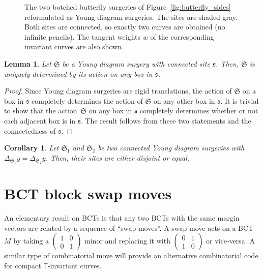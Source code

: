 \documentclass[11pt]{article}
\numberwithin{equation}{section}
\newtheorem{Corollary}[Theorem]{Corollary}
\newtheorem{Lemma}[Theorem]{Lemma}
\newcommand{\torus}{\mathbb T}
\newcommand{\site}{\mathfrak s}
\newcommand{\surgery}{\mathfrak S}
\begin{document}
\begin{figure}
{
}

\caption{The two botched butterfly surgeries of Figure~\ref{fig:butterfly_sides} reformulated as Young diagram surgeries. The sites are shaded gray. Both sites are connected, so exactly two curves are obtained (no infinite pencils). The tangent weights $w$ of the corresponding invariant curves are also shown.}
\label{fig:yd_surgeries}
\end{figure}

\begin{Lemma} \label{lemma:surgery_uniqueness}
Let $\surgery$ be a Young diagram surgery with connected site $\site$. Then, $\surgery$ is uniquely determined by its action on any box in $\site$.
\end{Lemma}
\begin{proof}
Since Young diagram surgeries are rigid translations, the action of $\surgery$ on a box in $\site$ completely determines the action of $\surgery$ on any other box in $\site$. It is trivial to show that the action~$\surgery$ on any box in $\site$ completely determines whether or not each adjacent box is in $\site$. The result follows from these two statements and the connectedness of $\site$.
\end{proof}


\begin{Corollary} \label{cor:disjoint_sites}
Let $\surgery_1$ and $\surgery_2$ be two connected Young diagram surgeries with $\Delta_{\surgery_1}y=\Delta_{\surgery_2}y$. Then, their sites are either disjoint or equal.
\end{Corollary}

\section{BCT block swap moves} \label{sec:block_swap}
An elementary result on BCTs is that any two BCTs with the same margin vectors are related by a sequence of ``swap moves''. A swap move acts on a BCT $M$ by taking a $\left(\begin{smallmatrix} 1 & 0 \\ 0 & 1 \end{smallmatrix}\right)$ minor and replacing it with $\left(\begin{smallmatrix} 0 & 1 \\ 1 & 0 \end{smallmatrix}\right)$ or vice-versa. A similar type of combinatorial move will provide an alternative combinatorial code for compact $\torus$-invariant curves.
\end{document}
